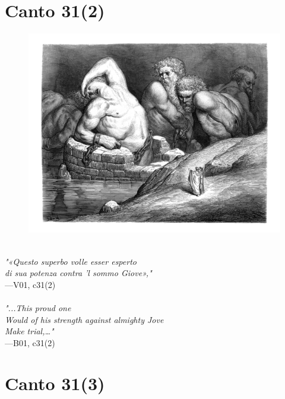 \documentclass[../Dore_vision.tex]{subfiles}
\begin{document}
\section{Canto 31(2)}

\begin{figure}[ht]
\centering
\includegraphics[height=\figsize]{illustrations/book_1/V01, c31(2).jpg}
\end{figure}

\begin{center}
\begin{minipage}{0.8\linewidth}
\textit{\\
"«Questo superbo volle esser esperto\\di sua potenza contra ’l sommo Giove»,"} \\
—V01, c31(2) \\~\\
\textit{"...\textquotesingle This proud one\\Would of his strength against almighty Jove\\Make trial,\textquotesingle…"} \\
—B01, c31(2)
\end{minipage}
\end{center}

\newpage

\section{Canto 31(3)}
\end{document}
